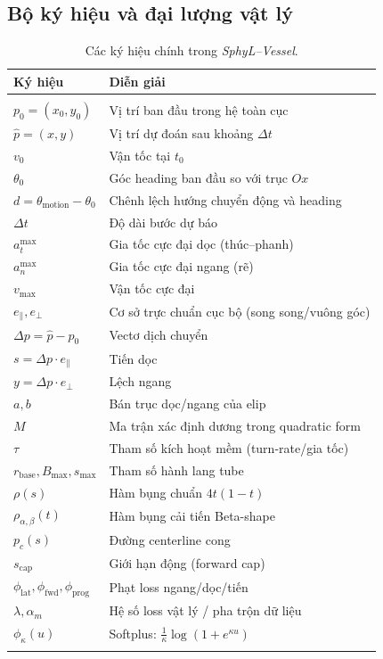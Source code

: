 \documentclass{IEEEtran}
\begin{document}
\subsection{Bộ ký hiệu và đại lượng vật lý}\label{sec:notation}

\begin{table}[H]
\caption{Các ký hiệu chính trong \emph{SphyL--Vessel}.}
\label{tab:sphyl-symbols}
\centering
\begin{tabular}{ll}
\hline
Ký hiệu & Diễn giải \\
\hline\\[4pt]
$p_0=(x_0,y_0)$ & Vị trí ban đầu trong hệ toàn cục \\
$\hat{p}=(x,y)$ & Vị trí dự đoán sau khoảng $\Delta t$ \\
$v_0$ & Vận tốc tại $t_0$ \\
$\theta_0$ & Góc heading ban đầu so với trục $Ox$ \\
$d=\theta_{\text{motion}}-\theta_0$ & Chênh lệch hướng chuyển động và heading \\
$\Delta t$ & Độ dài bước dự báo \\
$a_t^{\max}$ & Gia tốc cực đại dọc (thúc--phanh) \\
$a_n^{\max}$ & Gia tốc cực đại ngang (rẽ) \\
$v_{\max}$ & Vận tốc cực đại \\
$e_{\parallel},e_{\perp}$ & Cơ sở trực chuẩn cục bộ (song song/vuông góc) \\
$\Delta p=\hat{p}-p_0$ & Vectơ dịch chuyển \\
$s=\Delta p \cdot e_{\parallel}$ & Tiến dọc \\
$y=\Delta p \cdot e_{\perp}$ & Lệch ngang \\
$a,b$ & Bán trục dọc/ngang của elip \\
$M$ & Ma trận xác định dương trong quadratic form \\
$\tau$ & Tham số kích hoạt mềm (turn-rate/gia tốc) \\
$r_{\text{base}}, B_{\max}, s_{\max}$ & Tham số hành lang tube \\
$\rho(s)$ & Hàm bụng chuẩn $4t(1-t)$ \\
$\rho_{\alpha,\beta}(t)$ & Hàm bụng cải tiến Beta-shape \\
$p_c(s)$ & Đường centerline cong \\
$s_{\text{cap}}$ & Giới hạn động (forward cap) \\
$\phi_{\text{lat}},\phi_{\text{fwd}},\phi_{\text{prog}}$ & Phạt loss ngang/dọc/tiến \\
$\lambda, \alpha_m$ & Hệ số loss vật lý / pha trộn dữ liệu \\
$\phi_{\kappa}(u)$ & Softplus: $\tfrac{1}{\kappa}\log(1+e^{\kappa u})$ \\
\\[4pt]
\hline
\end{tabular}
\end{table}
\end{document}
